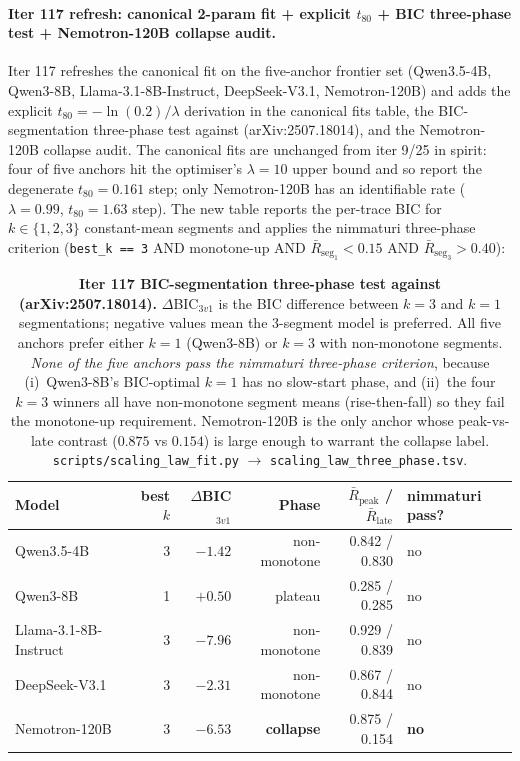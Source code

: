 \paragraph{Iter 117 refresh: canonical 2-param fit + explicit $t_{80}$ + BIC three-phase test + Nemotron-120B collapse audit.}
\label{par:scaling-iter117}
Iter 117 refreshes the canonical fit on the five-anchor frontier set
(Qwen3.5-4B, Qwen3-8B, Llama-3.1-8B-Instruct, DeepSeek-V3.1,
Nemotron-120B) and adds the explicit $t_{80}=-\ln(0.2)/\lambda$
derivation in the canonical fits table, the BIC-segmentation
three-phase test against \citet{nimmaturi2025predictive}
(arXiv:2507.18014), and the Nemotron-120B collapse audit.  The
canonical fits are unchanged from iter 9/25 in spirit: four of five
anchors hit the optimiser's $\lambda = 10$ upper bound and so report
the degenerate $t_{80} = 0.161$ step; only Nemotron-120B has an
identifiable rate ($\lambda = 0.99$, $t_{80} = 1.63$ step).  The new
table reports the per-trace BIC for $k \in \{1,2,3\}$ constant-mean
segments and applies the nimmaturi three-phase criterion
(\texttt{best\_k == 3} AND monotone-up AND
$\bar R_{\text{seg}_1} < 0.15$ AND $\bar R_{\text{seg}_3} > 0.40$):

\begin{table}[t]
  \centering
  \small
  \begin{tabular}{lrrrrl}
    \toprule
    Model & best $k$ & $\Delta$BIC$_{3v1}$ & Phase &
           $\bar R_{\text{peak}}$ / $\bar R_{\text{late}}$ &
           nimmaturi pass? \\
    \midrule
    Qwen3.5-4B             & 3 & $-1.42$ & non-monotone & 0.842 / 0.830 & no \\
    Qwen3-8B               & 1 & $+0.50$ & plateau       & 0.285 / 0.285 & no \\
    Llama-3.1-8B-Instruct  & 3 & $-7.96$ & non-monotone & 0.929 / 0.839 & no \\
    DeepSeek-V3.1          & 3 & $-2.31$ & non-monotone & 0.867 / 0.844 & no \\
    Nemotron-120B          & 3 & $-6.53$ & \textbf{collapse} & 0.875 / 0.154 & \textbf{no} \\
    \bottomrule
  \end{tabular}
  \caption{\textbf{Iter 117 BIC-segmentation three-phase test against
    \citet{nimmaturi2025predictive} (arXiv:2507.18014).}
    $\Delta$BIC$_{3v1}$ is the BIC difference between $k=3$ and
    $k=1$ segmentations; negative values mean the 3-segment model
    is preferred.  All five anchors prefer either $k=1$ (Qwen3-8B)
    or $k=3$ with non-monotone segments.  \emph{None of the five
    anchors pass the nimmaturi three-phase criterion}, because
    (i)~Qwen3-8B's BIC-optimal $k=1$ has no slow-start phase, and
    (ii)~the four $k=3$ winners all have non-monotone segment means
    (rise-then-fall) so they fail the monotone-up requirement.
    Nemotron-120B is the only anchor whose peak-vs-late contrast
    ($0.875$ vs $0.154$) is large enough to warrant the collapse
    label.  \texttt{scripts/scaling\_law\_fit.py} $\to$
    \texttt{scaling\_law\_three\_phase.tsv}.}
  \label{tab:scaling-iter117-bic}
\end{table}

